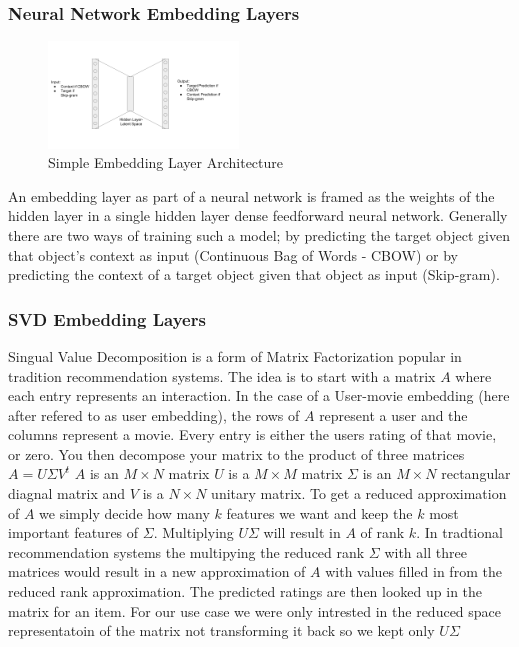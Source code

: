 \subsubsection{Neural Network Embedding Layers}
\begin{figure}[h]
    \centering
    \includegraphics[width=0.45\textwidth]{images/nn_embedding_layer.png}
    \caption{Simple Embedding Layer Architecture}
    \label{fig:Embedding Layer Architecture}
\end{figure}
An embedding layer as part of a neural network is framed as the weights of the hidden layer in a single hidden layer dense feedforward neural network. Generally there are two ways of training such a model; by predicting the target object given that object's context as input (Continuous Bag of Words - CBOW) or by predicting the context of a target object given that object as input (Skip-gram).

\subsubsection{SVD Embedding Layers}
Singual Value Decomposition is a form of Matrix Factorization popular in tradition recommendation systems. The idea is to start with a matrix $A$ where each entry represents an interaction. In the case of a User-movie embedding (here after refered to as user embedding), the rows of $A$ represent a user and the columns represent a movie. Every entry is either the users rating of that movie, or zero. You then decompose your matrix to the product of three matrices $A = U\Sigma V^t$ $A$ is an $M \times N$ matrix $U$ is a $M \times M$ matrix $\Sigma$ is an $M \times N$ rectangular diagnal matrix and $V$ is a $N \times N$ unitary matrix. To get a reduced approximation of $A$ we simply decide how many $k$ features we want and keep the $k$ most important features of $\Sigma$. Multiplying $U\Sigma$ will result in $A$ of rank $k$. In tradtional recommendation systems the multipying the reduced rank $\Sigma$ with all three matrices would result in a new approximation of $A$ with values filled in from the reduced rank approximation. The predicted ratings are then looked up in the matrix for an item. For our use case we were only intrested in the reduced space representatoin of the matrix not transforming it back so we kept only $U\Sigma$